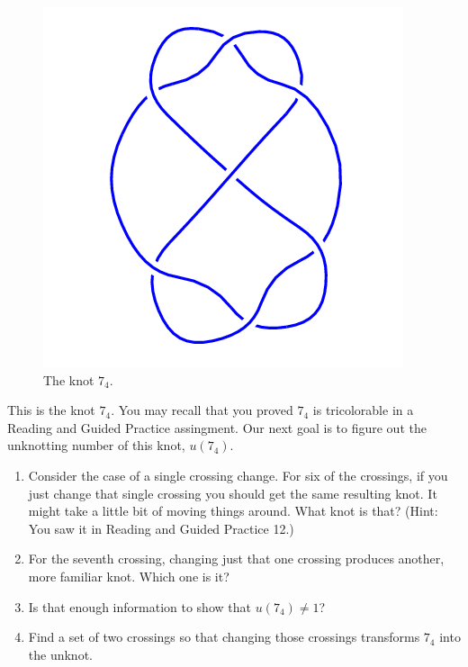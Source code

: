 \documentclass[12pt,letterpaper]{article}
\theoremstyle{definition}
\begin{document}
\begin{figure}
    \centering
    \includegraphics[width=.3\textwidth]{rgp08pics/7_4.png}
    \caption{The knot $7_4$.}
\end{figure}
This is the knot $7_4$. 
You may recall that you proved $7_4$ is tricolorable in a Reading and Guided Practice assingment.
Our next goal is to figure out the unknotting number of this knot, $u(7_4)$.
\begin{enumerate}
\item Consider the case of a single crossing change.
For six of the crossings, if you just change that single crossing you should get the same resulting knot.
It might take a little bit of moving things around.
What knot is that?
(Hint: You saw it in Reading and Guided Practice 12.)

\item For the seventh crossing, changing just that one crossing produces another, more familiar knot. 
Which one is it?

\item Is that enough information to show that $u(7_4) \neq 1$?

\item Find a set of two crossings so that changing those crossings transforms $7_4$ into the unknot.
\end{enumerate}
\end{document}
